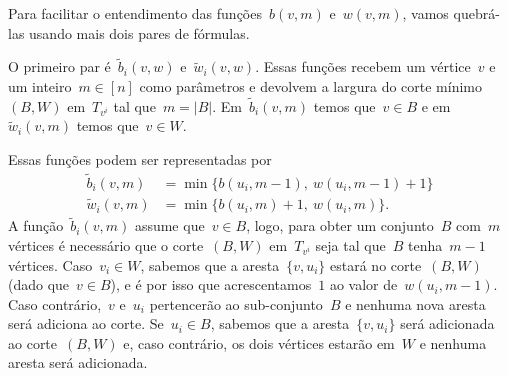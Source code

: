\begin{itemize}
\begin{center}
 \end{center}
	Para facilitar o entendimento das funções~$b(v,m)$ 
	e~$w(v,m)$, vamos quebrá-las usando mais dois pares 
	de fórmulas.

	O primeiro par é~$\tilde{b}_i(v,w)$ 
	e~$\tilde{w}_i(v,w)$. 
	Essas funções recebem um 
	vértice~$v$ e um inteiro~${m\in [n]}$ como parâmetros 
	e devolvem a largura do corte mínimo~$(B,W)$ 
	em~$T_{v^i}$ tal que~${m = |B|}$. 
	Em~$\tilde{b}_i(v,m)$ temos que~${v\in B}$ e
	em~$\tilde{w}_i(v,m)$ temos que~${v\in W}$.
	
	Essas funções podem ser representadas por
	\begin{align*}
		\tilde{b}_i(v,m) &= \min \{ b(u_i,m-1),\ w(u_i, m-1)+1 \} \nonumber \\
		\tilde{w}_i(v,m) &= \min \{ b(u_i,m)+1,\ w(u_i, m) \}. \nonumber
	\end{align*}
	A função~$\tilde{b}_i(v,m)$ assume que~${v\in B}$, 
	logo, para obter um conjunto~$B$ com~$m$ vértices
	é necessário que o corte~$(B,W)$ em~$T_{v^i}$ 
	seja tal que~$B$ tenha~${m-1}$ vértices. 
	Caso~${v_i\in W}$,
	sabemos que a aresta~${\{ v,u_i \}}$ estará
	no corte~$(B,W)$ (dado que~$v\in B$), e é por isso que 
	acrescentamos~$1$ ao valor de~${w(u_i, m-1)}$.
	Caso contrário,~$v$ e~$u_i$ pertencerão ao
	sub-conjunto~$B$ e nenhuma nova aresta
	será adiciona ao corte.
	Se~${u_i\in B}$, sabemos que a aresta~$\{ v,u_i \}$
	será adicionada ao corte~$(B,W)$ e, caso contrário,
	os dois vértices estarão em~$W$ e nenhuma aresta será
	adicionada.


\end{itemize}
